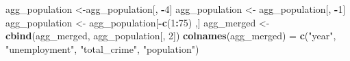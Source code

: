 \documentclass[
]{article}
\newenvironment{Shaded}{\begin{snugshade}}{\end{snugshade}}
\newcommand{\DecValTok}[1]{\textcolor[rgb]{0.00,0.00,0.81}{#1}}
\newcommand{\FunctionTok}[1]{\textcolor[rgb]{0.13,0.29,0.53}{\textbf{#1}}}
\newcommand{\NormalTok}[1]{#1}
\newcommand{\OtherTok}[1]{\textcolor[rgb]{0.56,0.35,0.01}{#1}}
\newcommand{\SpecialCharTok}[1]{\textcolor[rgb]{0.81,0.36,0.00}{\textbf{#1}}}
\newcommand{\StringTok}[1]{\textcolor[rgb]{0.31,0.60,0.02}{#1}}
\begin{document}
\begin{Shaded}
\begin{Highlighting}[]
\NormalTok{agg\_population }\OtherTok{\textless{}{-}}\NormalTok{agg\_population[, }\SpecialCharTok{{-}}\DecValTok{4}\NormalTok{]}
\NormalTok{agg\_population }\OtherTok{\textless{}{-}}\NormalTok{ agg\_population[, }\SpecialCharTok{{-}}\DecValTok{1}\NormalTok{]}
\NormalTok{agg\_population }\OtherTok{\textless{}{-}}\NormalTok{ agg\_population[}\SpecialCharTok{{-}}\FunctionTok{c}\NormalTok{(}\DecValTok{1}\SpecialCharTok{:}\DecValTok{75}\NormalTok{) ,]}
\NormalTok{agg\_merged }\OtherTok{\textless{}{-}} \FunctionTok{cbind}\NormalTok{(agg\_merged, agg\_population[, }\DecValTok{2}\NormalTok{])}
\FunctionTok{colnames}\NormalTok{(agg\_merged) }\OtherTok{=} \FunctionTok{c}\NormalTok{(}\StringTok{"year"}\NormalTok{, }\StringTok{"unemployment"}\NormalTok{, }\StringTok{"total\_crime"}\NormalTok{, }\StringTok{"population"}\NormalTok{)}
\end{Highlighting}
\end{Shaded}
\end{document}
